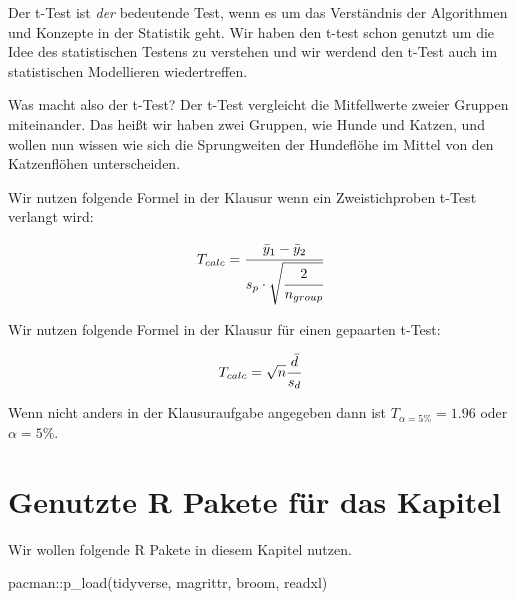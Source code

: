 \documentclass[
  letterpaper,
]{scrbook}
\newenvironment{Shaded}{\begin{snugshade}}{\end{snugshade}}
\newcommand{\FunctionTok}[1]{\textcolor[rgb]{0.28,0.35,0.67}{#1}}
\newcommand{\NormalTok}[1]{\textcolor[rgb]{0.00,0.23,0.31}{#1}}
\newcommand{\SpecialCharTok}[1]{\textcolor[rgb]{0.37,0.37,0.37}{#1}}
\begin{document}
Der t-Test ist \emph{der} bedeutende Test, wenn es um das Verständnis
der Algorithmen und Konzepte in der Statistik geht. Wir haben den t-test
schon genutzt um die Idee des statistischen Testens zu verstehen und wir
werdend den t-Test auch im statistischen Modellieren wiedertreffen.

Was macht also der t-Test? Der t-Test vergleicht die Mitfellwerte zweier
Gruppen miteinander. Das heißt wir haben zwei Gruppen, wie Hunde und
Katzen, und wollen nun wissen wie sich die Sprungweiten der Hundeflöhe
im Mittel von den Katzenflöhen unterscheiden.

\begin{tcolorbox}[enhanced jigsaw, coltitle=black, titlerule=0mm, bottomrule=.15mm, opacityback=0, opacitybacktitle=0.6, leftrule=.75mm, title=\textcolor{quarto-callout-caution-color}{\faFire}\hspace{0.5em}{Ein Wort zur Klausur}, toprule=.15mm, bottomtitle=1mm, toptitle=1mm, left=2mm, breakable, arc=.35mm, colback=white, rightrule=.15mm, colbacktitle=quarto-callout-caution-color!10!white, colframe=quarto-callout-caution-color-frame]
Wir nutzen folgende Formel in der Klausur wenn ein Zweistichproben
t-Test verlangt wird:

\[
T_{calc} = \cfrac{\bar{y}_1-\bar{y}_2}{s_{p} \cdot \sqrt{\cfrac{2}{n_{group}}}}
\]

Wir nutzen folgende Formel in der Klausur für einen gepaarten t-Test:

\[
T_{calc} = \sqrt{n}\cfrac{\bar{d}}{s_d}
\]

Wenn nicht anders in der Klausuraufgabe angegeben dann ist
\(T_{\alpha = 5\%} = 1.96\) oder \(\alpha = 5\%\).
\end{tcolorbox}

\hypertarget{genutzte-r-pakete-fuxfcr-das-kapitel-6}{%
\section{Genutzte R Pakete für das
Kapitel}\label{genutzte-r-pakete-fuxfcr-das-kapitel-6}}

Wir wollen folgende R Pakete in diesem Kapitel nutzen.

\begin{Shaded}
\begin{Highlighting}[]
\NormalTok{pacman}\SpecialCharTok{::}\FunctionTok{p\_load}\NormalTok{(tidyverse, magrittr, broom, readxl)}
\end{Highlighting}
\end{Shaded}
\end{document}
